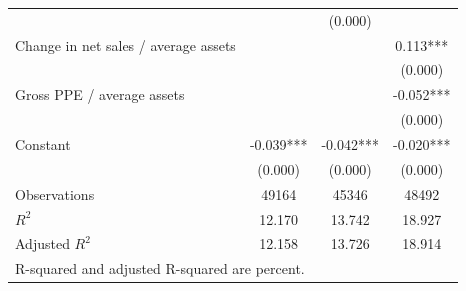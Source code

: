 {\begin{tabular}{l*{3}{c}}
                    &               &     (0.000)   &               \\
Change in net sales / average assets&               &               &       0.113***\\
                    &               &               &     (0.000)   \\
Gross PPE / average assets&               &               &      -0.052***\\
                    &               &               &     (0.000)   \\
Constant            &      -0.039***&      -0.042***&      -0.020***\\
                    &     (0.000)   &     (0.000)   &     (0.000)   \\
\hline
Observations        &       49164   &       45346   &       48492   \\
\(R^{2}\)           &      12.170   &      13.742   &      18.927   \\
Adjusted \(R^{2}\)  &      12.158   &      13.726   &      18.914   \\
\hline\hline
\multicolumn{4}{l}{\footnotesize R-squared and adjusted R-squared are percent.}\\
\end{tabular}
}
